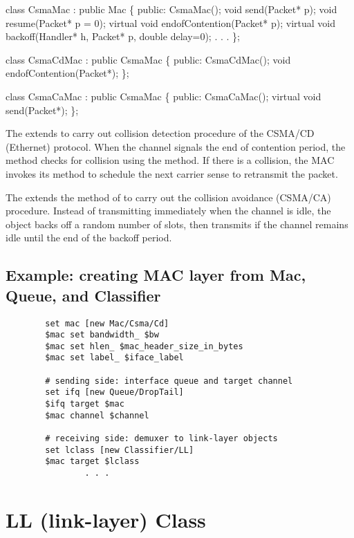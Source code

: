 \begin{program}
    class CsmaMac : public Mac \{
    public:
        CsmaMac();
        void send(Packet* p);
        void resume(Packet* p = 0);
        virtual void endofContention(Packet* p);
        virtual void backoff(Handler* h, Packet* p, double delay=0);
                . . .
    \};

    class CsmaCdMac : public CsmaMac \{
    public:
        CsmaCdMac();
        void endofContention(Packet*);
    \};

    class CsmaCaMac : public CsmaMac \{
    public:
        CsmaCaMac();
        virtual void send(Packet*);
    \};
\end{program}

The  extends  to carry out collision
detection procedure of the CSMA/CD (Ethernet) protocol.  When the
channel signals the end of contention period, the 
method checks for collision using the 
method.  If there is a collision, the MAC invokes its 
method to schedule the next carrier sense to retransmit the packet.

The  extends the  method of  to
carry out the collision avoidance (CSMA/CA) procedure.  Instead of
transmitting immediately when the channel is idle, the 
object backs off a random number of slots, then transmits if the channel
remains idle until the end of the backoff period.

\subsection{Example:  creating MAC layer from Mac, Queue, and Classifier}
\label{ex:maclayer}

\begin{verbatim}
        set mac [new Mac/Csma/Cd]
        $mac set bandwidth_ $bw
        $mac set hlen_ $mac_header_size_in_bytes
        $mac set label_ $iface_label

        # sending side: interface queue and target channel
        set ifq [new Queue/DropTail]
        $ifq target $mac
        $mac channel $channel

        # receiving side: demuxer to link-layer objects
        set lclass [new Classifier/LL]
        $mac target $lclass
                . . .
\end{verbatim}


\section{LL (link-layer) Class}
\label{sec:linklayer}

